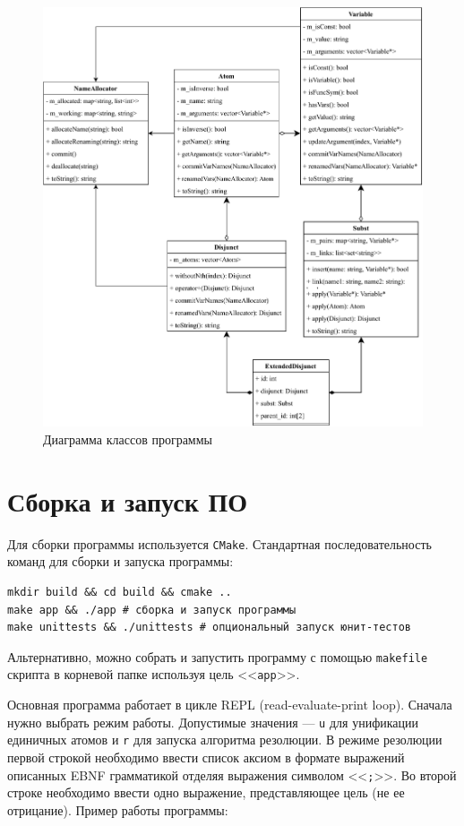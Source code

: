 \begin{figure}[h!]
    \centering
    \includegraphics[width=\linewidth]{uml.pdf}
    \caption{Диаграмма классов программы}
\end{figure}

\section{Сборка и запуск ПО}

Для сборки программы используется \texttt{CMake}. Стандартная последовательность команд для сборки и запуска программы:

\begin{verbatim}
mkdir build && cd build && cmake ..
make app && ./app # сборка и запуск программы
make unittests && ./unittests # опциональный запуск юнит-тестов
\end{verbatim}

Альтернативно, можно собрать и запустить программу с помощью \texttt{makefile} скрипта в корневой папке используя цель <<\texttt{app}>>.

Основная программа работает в цикле REPL (read-evaluate-print loop). Сначала нужно выбрать режим работы. Допустимые значения --- \texttt{u} для унификации единичных атомов и \texttt{r} для запуска алгоритма резолюции. В режиме резолюции первой строкой необходимо ввести список аксиом в формате выражений описанных EBNF грамматикой отделяя выражения символом <<\texttt{;}>>. Во второй строке необходимо ввести одно выражение, представляющее цель (не ее отрицание). Пример работы программы:


